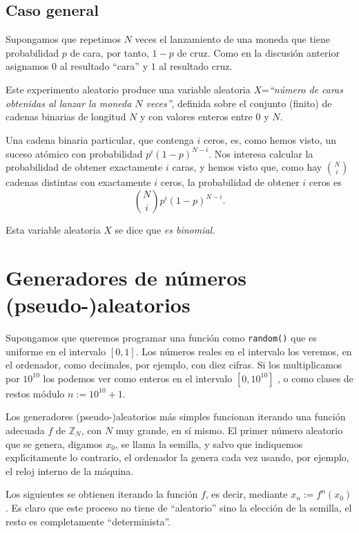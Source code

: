 \subsection{Caso general}

Supongamos que repetimos $N$ veces el lanzamiento de una moneda que tiene
probabilidad $p$ de cara, por tanto,  $1-p$ de cruz. Como en la discusi\'on
anterior asignamos $0$ al resultado ``cara'' y $1$ al resultado cruz.

Este experimento aleatorio
produce  una variable aleatoria $X$={\itshape ``n\'umero de caras obtenidas al
lanzar la
moneda $N$ veces''}, definida sobre el conjunto (finito) de cadenas binarias de
longitud $N$ y con valores enteros entre $0$ y $N$.

Una cadena binaria particular, que contenga $i$ ceros, es, como hemos visto,  un
suceso at\'omico con probabilidad 
$p^i(1-p)^{N-i}.$ Nos interesa calcular la probabilidad de obtener exactamente
$i$ caras, y hemos visto que,  como hay 
$\binom{N}{i}$ cadenas distintas con exactamente $i$ ceros, la probabilidad de
obtener $i$ ceros es 
\[\binom{N}{i} p^i(1-p)^{N-i}.\]

Esta variable aleatoria $X$ se dice que {\itshape es binomial.}


 \section{Generadores de n\'umeros (pseudo-)aleatorios}
Supongamos que queremos programar una función como \lstinline|random()|  que es
uniforme en el intervalo $[0,1]$. Los números reales en el intervalo los
veremos, en el ordenador, como decimales, por ejemplo, con diez cifras. Si los
multiplicamos por $10^{10}$  los podemos ver como enteros en el intervalo
$[0,10^{10}]$ , o como clases de restos módulo $n:=10^{10}+1.$

Los generadores (pseudo-)aleatorios m\'as simples funcionan iterando
una función adecuada $f$ de $\mathbb{Z}_N$, con $N$ muy grande,  en sí mismo. El
primer n\'umero aleatorio que se genera, digamos $x_0$, se llama la semilla, y
salvo que indiquemos expl\'{\i}citamente lo contrario, el ordenador la genera
cada vez usando, por ejemplo, el reloj interno de la m\'aquina.

Los siguientes se obtienen iterando la funci\'on $f$, es decir, mediante
$x_n:=f^n(x_0)$. Es claro que este proceso no tiene de ``aleatorio'' sino la
elecci\'on de la semilla, el resto es completamente ``determinista''.

